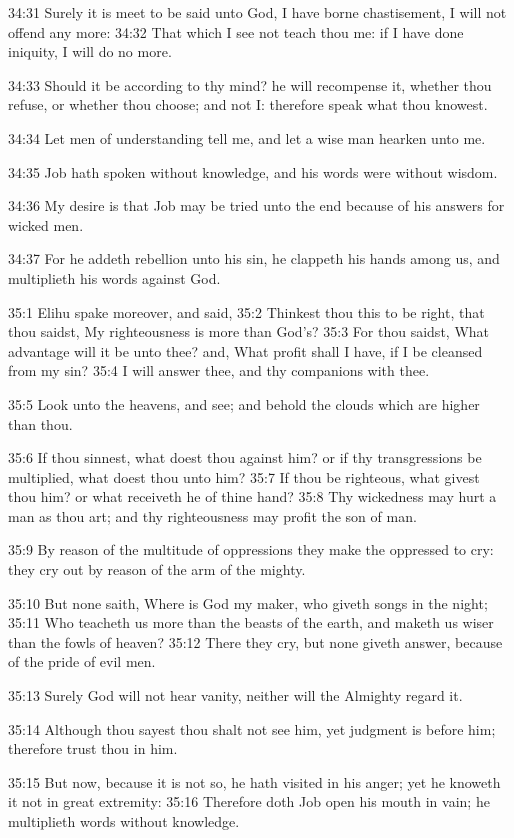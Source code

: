 34:31 Surely it is meet to be said unto God, I have borne
chastisement, I will not offend any more: 34:32 That which I see not
teach thou me: if I have done iniquity, I will do no more.

34:33 Should it be according to thy mind? he will recompense it,
whether thou refuse, or whether thou choose; and not I: therefore
speak what thou knowest.

34:34 Let men of understanding tell me, and let a wise man hearken
unto me.

34:35 Job hath spoken without knowledge, and his words were without
wisdom.

34:36 My desire is that Job may be tried unto the end because of his
answers for wicked men.

34:37 For he addeth rebellion unto his sin, he clappeth his hands
among us, and multiplieth his words against God.

35:1 Elihu spake moreover, and said, 35:2 Thinkest thou this to be
right, that thou saidst, My righteousness is more than God's?  35:3
For thou saidst, What advantage will it be unto thee? and, What profit
shall I have, if I be cleansed from my sin?  35:4 I will answer thee,
and thy companions with thee.

35:5 Look unto the heavens, and see; and behold the clouds which are
higher than thou.

35:6 If thou sinnest, what doest thou against him? or if thy
transgressions be multiplied, what doest thou unto him?  35:7 If thou
be righteous, what givest thou him? or what receiveth he of thine
hand?  35:8 Thy wickedness may hurt a man as thou art; and thy
righteousness may profit the son of man.

35:9 By reason of the multitude of oppressions they make the oppressed
to cry: they cry out by reason of the arm of the mighty.

35:10 But none saith, Where is God my maker, who giveth songs in the
night; 35:11 Who teacheth us more than the beasts of the earth, and
maketh us wiser than the fowls of heaven?  35:12 There they cry, but
none giveth answer, because of the pride of evil men.

35:13 Surely God will not hear vanity, neither will the Almighty
regard it.

35:14 Although thou sayest thou shalt not see him, yet judgment is
before him; therefore trust thou in him.

35:15 But now, because it is not so, he hath visited in his anger; yet
he knoweth it not in great extremity: 35:16 Therefore doth Job open
his mouth in vain; he multiplieth words without knowledge.

